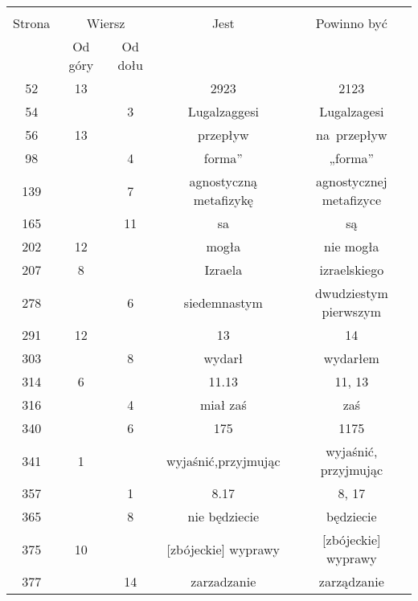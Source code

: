 \documentclass[a4paper,11pt]{article}
\begin{document}
\begin{center}

  \begin{tabular}{|c|c|c|c|c|}
    \hline
    & \multicolumn{2}{c|}{} & & \\
    Strona & \multicolumn{2}{c|}{Wiersz} & Jest
                              & Powinno być \\ \cline{2-3}
    & Od góry & Od dołu & & \\
    \hline
    52  & 13 & & 2923 & 2123 \\
    54  & &  3 & Lugalzaggesi & Lugalzagesi \\
    56  & 13 & & przepływ & na~przepływ \\
    98  & &  4 & forma” & „forma” \\
    139 & &  7 & agnostyczną metafizykę & agnostycznej metafizyce \\
    165 & & 11 & sa & są \\
    202 & 12 & & mogła & nie mogła \\
    207 &  8 & & Izraela & izraelskiego \\
    278 & &  6 & siedemnastym & dwudziestym pierwszym \\
    291 & 12 & & 13 & 14 \\
    303 & &  8 & wydarł & wydarłem \\
    314 &  6 & & 11.13 & 11, 13 \\
    316 & &  4 & miał zaś & zaś \\
    340 & &  6 & 175 & 1175 \\
    341 &  1 & & wyjaśnić,przyjmując & wyjaśnić, przyjmując \\
    357 & &  1 & 8.17 & 8, 17 \\
    365 & &  8 & nie będziecie & będziecie \\
    375 & 10 & & [zbójeckie]{ } wyprawy & [zbójeckie] wyprawy \\
    377 & & 14 & zarzadzanie & zarządzanie \\
    \hline
  \end{tabular}

\end{center}


\vspace{\spaceTwo}
\end{document}
